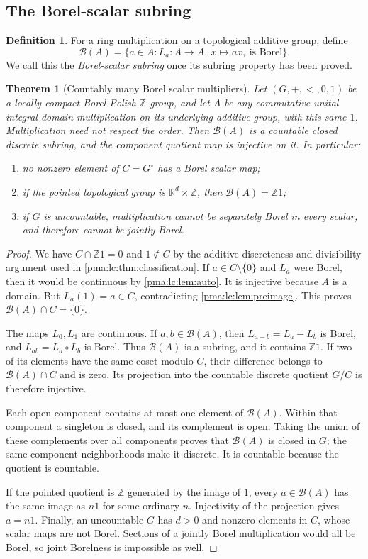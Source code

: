 \documentclass[11pt]{article}
\numberwithin{equation}{section}
\newtheorem{theorem}{Theorem}[section]
\theoremstyle{definition}
\newtheorem{definition}[definition]{Definition}
\theoremstyle{remark}
\newcommand{\Z}{\mathbb Z}
\newcommand{\R}{\mathbb R}
\newcommand{\Bsc}{\mathcal B(A)}
\begin{document}
\subsection{The Borel-scalar subring}
\begin{definition}
For a ring multiplication on a topological additive group, define
\[
 \Bsc=\{a\in A: L_a:A\to A,\ x\mapsto ax,\ \text{is Borel}\}.
\]
We call this the \emph{Borel-scalar subring} once its subring property
has been proved.
\end{definition}

\begin{theorem}[Countably many Borel scalar multipliers]\label{pma:lc:thm:scalars}
Let $(G,+,<,0,1)$ be a locally compact Borel Polish $\Z$-group, and let
$A$ be any commutative unital integral-domain multiplication on its
underlying additive group, with this same $1$. Multiplication need not
respect the order. Then $\Bsc$ is a countable closed discrete subring,
and the component quotient map is injective on it. In particular:
\begin{enumerate}
\item no nonzero element of $C=G^\circ$ has a Borel scalar map;
\item if the pointed topological group is $\R^d\times\Z$, then
      $\Bsc=\Z1$;
\item if $G$ is uncountable, multiplication cannot be separately Borel
      in every scalar, and therefore cannot be jointly Borel.
\end{enumerate}
\end{theorem}
\begin{proof}
We have $C\cap\Z1=0$ and $1\notin C$ by the additive discreteness
and divisibility argument used in \cref{pma:lc:thm:classification}. If
$a\in C\setminus\{0\}$ and $L_a$ were Borel, then it would be
continuous by \cref{pma:lc:lem:auto}. It is injective because $A$ is a domain.
But $L_a(1)=a\in C$, contradicting \cref{pma:lc:lem:preimage}. This proves
$\Bsc\cap C=\{0\}$.

The maps $L_0,L_1$ are continuous. If $a,b\in\Bsc$, then
$L_{a-b}=L_a-L_b$ is Borel, and $L_{ab}=L_a\circ L_b$ is Borel.
Thus $\Bsc$ is a subring, and it contains $\Z1$. If two of its
elements have the same coset modulo $C$, their difference belongs to
$\Bsc\cap C$ and is zero. Its projection into the countable discrete
quotient $G/C$ is therefore injective.

Each open component contains at most one element of $\Bsc$. Within
that component a singleton is closed, and its complement is open.
Taking the union of these complements over all components proves that
$\Bsc$ is closed in $G$; the same component neighborhoods make it
discrete. It is countable because the quotient is countable.

If the pointed quotient is $\Z$ generated by the image of $1$, every
$a\in\Bsc$ has the same image as $n1$ for some ordinary $n$.
Injectivity of the projection gives $a=n1$. Finally, an uncountable
$G$ has $d>0$ and nonzero elements in $C$, whose scalar maps are not
Borel. Sections of a jointly Borel multiplication would all be Borel,
so joint Borelness is impossible as well.
\end{proof}
\end{document}
